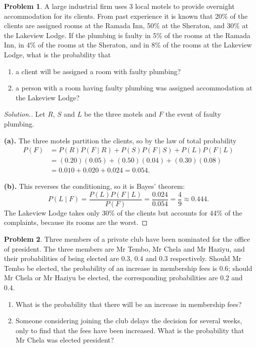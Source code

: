 \documentclass[12pt,a4paper]{report}
\theoremstyle{definition}
\theoremstyle{plain}
\theoremstyle{definition}
\newtheorem{problemx}{Problem}[section]
\newenvironment{problem}{\begin{problemx}}{\end{problemx}}
\newenvironment{solution}
  {\renewcommand{\qedsymbol}{}\begin{proof}[\textit{Solution}.]}
  {\end{proof}}
\begin{document}
\begin{problem}
A large industrial firm uses 3 local motels to provide overnight accommodation for its
clients. From past experience it is known that 20\% of the clients are assigned rooms at
the Ramada Inn, 50\% at the Sheraton, and 30\% at the Lakeview Lodge. If the plumbing is
faulty in 5\% of the rooms at the Ramada Inn, in 4\% of the rooms at the Sheraton, and in
8\% of the rooms at the Lakeview Lodge, what is the probability that
\begin{enumerate}
\item[(a).] a client will be assigned a room with faulty plumbing?
\item[(b).] a person with a room having faulty plumbing was assigned accommodation at the
Lakeview Lodge?
\end{enumerate}
\end{problem}

\begin{solution}
Let $R$, $S$ and $L$ be the three motels and $F$ the event of faulty plumbing.

\textbf{(a).} The three motels partition the clients, so by the law of total probability
\begin{align*}
P(F) &= P(R)P(F\mid R)+P(S)P(F\mid S)+P(L)P(F\mid L)\\
     &= (0.20)(0.05)+(0.50)(0.04)+(0.30)(0.08)\\
     &= 0.010+0.020+0.024 = 0.054.
\end{align*}

\textbf{(b).} This reverses the conditioning, so it is Bayes' theorem:
\[P(L\mid F) = \frac{P(L)P(F\mid L)}{P(F)} = \frac{0.024}{0.054} = \frac{4}{9} \approx 0.444.\]
The Lakeview Lodge takes only 30\% of the clients but accounts for 44\% of the complaints,
because its rooms are the worst.
\end{solution}

\begin{problem}
Three members of a private club have been nominated for the office of president. The
three members are Mr Tembo, Mr Chela and Mr Haziyu, and their probabilities of being
elected are $0.3$, $0.4$ and $0.3$ respectively. Should Mr Tembo be elected, the
probability of an increase in membership fees is $0.6$; should Mr Chela or Mr Haziyu be
elected, the corresponding probabilities are $0.2$ and $0.4$.
\begin{enumerate}
\item[(a).] What is the probability that there will be an increase in membership fees?
\item[(b).] Someone considering joining the club delays the decision for several weeks,
only to find that the fees have been increased. What is the probability that Mr Chela was
elected president?
\end{enumerate}
\end{problem}
\end{document}
